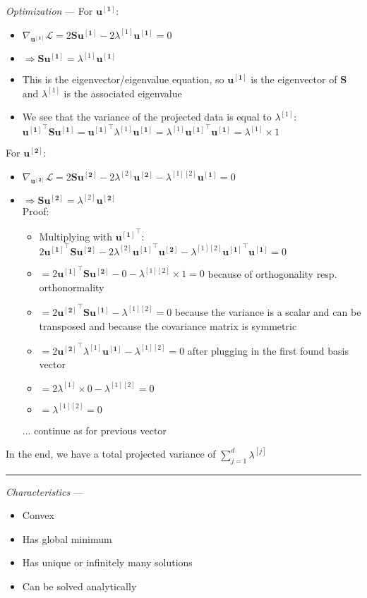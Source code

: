 \emph{Optimization} --- 
For $\boldsymbol{u^{[1]}}$: 
\begin{itemize}
    \item $\nabla_{\boldsymbol{u^{[1]}}} \mathcal{L} = 2 \boldsymbol{S} \boldsymbol{u^{[1]}} - 2 \lambda^{[1]} \boldsymbol{u^{[1]}} = 0$
    \item $\Rightarrow \boldsymbol{S} \boldsymbol{u^{[1]}} = \lambda^{[1]} \boldsymbol{u^{[1]}}$
    \item This is the eigenvector/eigenvalue equation, so $\boldsymbol{u^{[1]}}$ is the eigenvector of $\boldsymbol{S}$ and $\lambda^{[1]}$ is the associated eigenvalue
    \item We see that the variance of the projected data is equal to $\lambda^{[1]}$:
    $\boldsymbol{u^{[1]}}^\intercal \boldsymbol{S} \boldsymbol{u^{[1]}} = \boldsymbol{u^{[1]}}^\intercal \lambda^{[1]} \boldsymbol{u^{[1]}} = \lambda^{[1]} \boldsymbol{u^{[1]}}^\intercal \boldsymbol{u^{[1]}} = \lambda^{[1]} \times 1$
\end{itemize}
For $\boldsymbol{u^{[2]}}$: 
\begin{itemize}
    \item $\nabla_{\boldsymbol{u^{[2]}}} \mathcal{L} = 2 \boldsymbol{S} \boldsymbol{u^{[2]}} - 2 \lambda^{[2]} \boldsymbol{u^{[2]}} - \lambda^{[1][2]} \boldsymbol{u^{[1]}} = 0$
    \item $\Rightarrow \boldsymbol{S} \boldsymbol{u^{[2]}} = \lambda^{[2]} \boldsymbol{u^{[2]}}$ \\
    Proof: 
    \begin{itemize}
        \item Multiplying with $\boldsymbol{u^{[1]}}^\intercal$: $2 \boldsymbol{u^{[1]}}^\intercal \boldsymbol{S} \boldsymbol{u^{[2]}} - 2 \lambda^{[2]} \boldsymbol{u^{[1]}}^\intercal \boldsymbol{u^{[2]}} - \lambda^{[1][2]} \boldsymbol{u^{[1]}}^\intercal \boldsymbol{u^{[1]}} = 0$
        \item $ = 2 \boldsymbol{u^{[1]}}^\intercal \boldsymbol{S} \boldsymbol{u^{[2]}} - 0 - \lambda^{[1][2]} \times 1 = 0$ because of orthogonality resp. orthonormality
        \item $ = 2 \boldsymbol{u^{[2]}}^\intercal \boldsymbol{S} \boldsymbol{u^{[1]}} - \lambda^{[1][2]} = 0$ because the variance is a scalar and can be transposed and because the covariance matrix is symmetric
        \item $ = 2 \boldsymbol{u^{[2]}}^\intercal \lambda^{[1]} \boldsymbol{u^{[1]}} - \lambda^{[1][2]} = 0$ after plugging in the first found basis vector
        \item $ = 2 \lambda^{[1]} \times 0 - \lambda^{[1][2]} = 0$
        \item $ = \lambda^{[1][2]} = 0$
    \end{itemize}
    \item [...] continue as for previous vector
\end{itemize}
In the end, we have a total projected variance of $\sum_{j=1}^d \lambda^{[j]}$

{\color{lightgray}\hrule height 0.001mm}

\emph{Characteristics} --- 
\begin{itemize}
    \item Convex 
    \item Has global minimum
    \item Has unique or infinitely many solutions
    \item Can be solved analytically
\end{itemize}